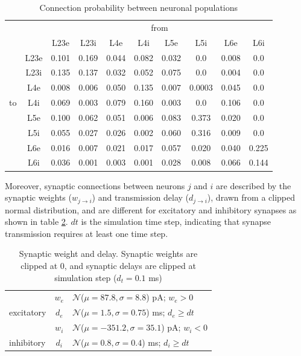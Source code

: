 \documentclass[11pt]{scrartcl}
\begin{document}
\begin{table}[htbp]
    \centering
    \caption{\label{table:PD_conectivity} Connection probability between neuronal populations
    }
    \begin{tabular}{lccccccccc}
         &  & \multicolumn{8}{c}{from} \tabularnewline
         &  & L23e & L23i & L4e & L4i & L5e & L5i & L6e & L6i \tabularnewline
         & L23e & 0.101 & 0.169 & 0.044 & 0.082 & 0.032 & 0.0 & 0.008 & 0.0 \tabularnewline
         & L23i & 0.135 & 0.137 & 0.032 & 0.052 & 0.075 & 0.0 & 0.004 & 0.0 \tabularnewline
         & L4e & 0.008 & 0.006 & 0.050 & 0.135 & 0.007 & 0.0003 & 0.045 & 0.0 \tabularnewline
         to & L4i & 0.069 & 0.003 & 0.079 & 0.160 & 0.003 & 0.0 & 0.106 & 0.0 \tabularnewline
         & L5e & 0.100 & 0.062 & 0.051 & 0.006 & 0.083 & 0.373 & 0.020 & 0.0 \tabularnewline
         & L5i & 0.055 & 0.027 & 0.026 & 0.002 & 0.060 & 0.316 & 0.009 & 0.0 \tabularnewline
         & L6e & 0.016 & 0.007 & 0.021 & 0.017 & 0.057 & 0.020 & 0.040 & 0.225 \tabularnewline
         & L6i & 0.036 & 0.001 & 0.003 & 0.001 & 0.028 & 0.008 & 0.066 & 0.144 
         \tabularnewline
    \end{tabular}
\end{table}

Moreover, synaptic connections between neurons \(j\) and \(i\) are described by the synaptic weights (\(w_{j \to i}\)) and transmission delay (\(d_{j \to i}\)), drawn from a clipped normal distribution, and are different for excitatory and inhibitory synapses as shown in table \ref{table:PD_synaptic_weight_delay}. \(dt\) is the simulation time step, indicating that synapse transmission requires at least one time step.

\begin{table}[htb!]
    \centering
    \caption{Synaptic weight and delay. Synaptic weights are clipped at 0, and synaptic delays are clipped at simulation step ($d_t = 0.1$ ms)}
    \label{table:PD_synaptic_weight_delay}
    \begin{tabular}{lcl}
         &
         $w_e$ & $\mathcal{N}$($\mu = 87.8, \sigma = 8.8$) pA; $w_e > 0$ \\
         excitatory & $d_e$ & $\mathcal{N}$($\mu=1.5 , \sigma = 0.75$) ms; $d_e \geq dt$ \\
         &
         $w_i$ & $\mathcal{N}$($\mu = -351.2, \sigma = 35.1$) pA; $w_i < 0$ \\
         inhibitory & $d_i$ & $\mathcal{N}$($\mu=0.8 , \sigma = 0.4$) ms; $d_i \geq dt$
    \end{tabular}
\end{table}
\end{document}
